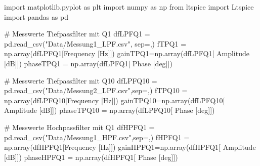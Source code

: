 \documentclass[
  ngerman,
  letterpaper,
  DIV=11]{scrreprt}
\newenvironment{Shaded}{}{}
\newcommand{\CommentTok}[1]{\textcolor[rgb]{0.42,0.45,0.49}{#1}}
\newcommand{\ImportTok}[1]{\textcolor[rgb]{0.01,0.18,0.38}{#1}}
\newcommand{\NormalTok}[1]{\textcolor[rgb]{0.14,0.16,0.18}{#1}}
\newcommand{\OperatorTok}[1]{\textcolor[rgb]{0.14,0.16,0.18}{#1}}
\newcommand{\StringTok}[1]{\textcolor[rgb]{0.01,0.18,0.38}{#1}}
\begin{document}
\begin{Shaded}
\begin{Highlighting}[]
\ImportTok{import}\NormalTok{ matplotlib.pyplot }\ImportTok{as}\NormalTok{ plt}
\ImportTok{import}\NormalTok{ numpy }\ImportTok{as}\NormalTok{ np}
\ImportTok{from}\NormalTok{ ltspice }\ImportTok{import}\NormalTok{ Ltspice}
\ImportTok{import}\NormalTok{ pandas }\ImportTok{as}\NormalTok{ pd}
\end{Highlighting}
\end{Shaded}

\begin{Shaded}
\begin{Highlighting}[]
\CommentTok{\# Messwerte Tiefpassfilter mit Q1}
\NormalTok{dfLPFQ1 }\OperatorTok{=}\NormalTok{ pd.read\_csv(}\StringTok{"Data/Messung1\_LPF.csv"}\NormalTok{, sep}\OperatorTok{=}\StringTok{\textquotesingle{},\textquotesingle{}}\NormalTok{)}
\NormalTok{fTPQ1 }\OperatorTok{=}\NormalTok{ np.array(dfLPFQ1[}\StringTok{\textquotesingle{}Frequency [Hz]\textquotesingle{}}\NormalTok{])}
\NormalTok{gainTPQ1}\OperatorTok{=}\NormalTok{np.array(dfLPFQ1[}\StringTok{\textquotesingle{} Amplitude [dB]\textquotesingle{}}\NormalTok{])}
\NormalTok{phaseTPQ1 }\OperatorTok{=}\NormalTok{ np.array(dfLPFQ1[}\StringTok{\textquotesingle{} Phase [deg]\textquotesingle{}}\NormalTok{])}

\CommentTok{\# Messwerte Tiefpassfilter mit Q10}
\NormalTok{dfLPFQ10 }\OperatorTok{=}\NormalTok{ pd.read\_csv(}\StringTok{"Data/Messung2\_LPF.csv"}\NormalTok{,sep}\OperatorTok{=}\StringTok{\textquotesingle{},\textquotesingle{}}\NormalTok{)}
\NormalTok{fTPQ10 }\OperatorTok{=}\NormalTok{ np.array(dfLPFQ10[}\StringTok{\textquotesingle{}Frequency [Hz]\textquotesingle{}}\NormalTok{])}
\NormalTok{gainTPQ10}\OperatorTok{=}\NormalTok{np.array(dfLPFQ10[}\StringTok{\textquotesingle{} Amplitude [dB]\textquotesingle{}}\NormalTok{])}
\NormalTok{phaseTPQ10 }\OperatorTok{=}\NormalTok{ np.array(dfLPFQ10[}\StringTok{\textquotesingle{} Phase [deg]\textquotesingle{}}\NormalTok{])}

\CommentTok{\# Messwerte Hochpassfilter mit Q1}
\NormalTok{dfHPFQ1 }\OperatorTok{=}\NormalTok{ pd.read\_csv(}\StringTok{"Data/Messung1\_HPF.csv"}\NormalTok{,sep}\OperatorTok{=}\StringTok{\textquotesingle{},\textquotesingle{}}\NormalTok{)}
\NormalTok{fHPFQ1 }\OperatorTok{=}\NormalTok{ np.array(dfHPFQ1[}\StringTok{\textquotesingle{}Frequency [Hz]\textquotesingle{}}\NormalTok{])}
\NormalTok{gainHPFQ1}\OperatorTok{=}\NormalTok{np.array(dfHPFQ1[}\StringTok{\textquotesingle{} Amplitude [dB]\textquotesingle{}}\NormalTok{])}
\NormalTok{phaseHPFQ1 }\OperatorTok{=}\NormalTok{ np.array(dfHPFQ1[}\StringTok{\textquotesingle{} Phase [deg]\textquotesingle{}}\NormalTok{])}


\end{Highlighting}
\end{Shaded}
\end{document}

